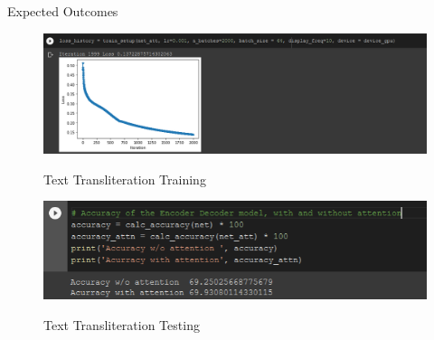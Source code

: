 \documentclass{beamer}
\begin{document}
\begin{frame}[allowframebreaks]{Expected Outcomes}
	\begin{figure}
				{\includegraphics[scale=.3]{Transliteration_Training_Result}}
				\caption{Text Transliteration Training}
				\label{Transliteration_Training_Result}
	\end{figure}
	\begin{figure}
				{\includegraphics[scale=.3]{Transliteration_Testing_Result}}
				\caption{Text Transliteration Testing}
				\label{Transliteration_Testing_Result}
	\end{figure}
	\begin{figure}
           \begin{subfigure}[b]{0.3\linewidth}

\end{subfigure}
\end{figure}
\end{frame}
\end{document}
